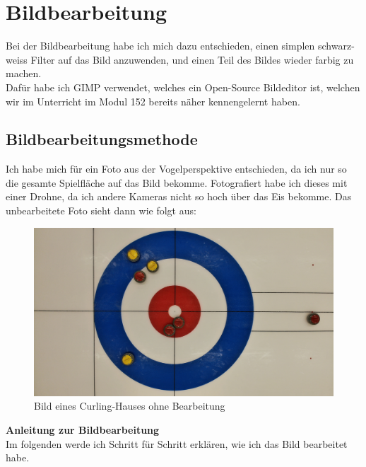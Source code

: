\documentclass[11pt]{article}
\begin{document}
    \section{Bildbearbeitung}
    Bei der Bildbearbeitung habe ich mich dazu entschieden, einen simplen schwarz-weiss Filter auf das Bild
    anzuwenden, und einen Teil des Bildes wieder farbig zu machen.\\
    Dafür habe ich GIMP verwendet, welches ein Open-Source Bildeditor ist, welchen wir im Unterricht im Modul
    152 bereits näher kennengelernt haben.


    \subsection{Bildbearbeitungsmethode}
    Ich habe mich für ein Foto aus der Vogelperspektive entschieden, da ich nur so die gesamte Spielfläche
    auf das Bild bekomme. Fotografiert habe ich dieses mit einer Drohne, da ich andere Kameras nicht so hoch
    über das Eis bekomme. Das unbearbeitete Foto sieht dann wie folgt aus:\\
    \begin{figure}[h]
        \includegraphics[width=\textwidth]{media/unedited}
        \caption{Bild eines Curling-Hauses ohne Bearbeitung}
    \end{figure}

    \pagebreak

    \textbf{Anleitung zur Bildbearbeitung}\\
    Im folgenden werde ich Schritt für Schritt erklären, wie ich das Bild bearbeitet habe.
\end{document}

